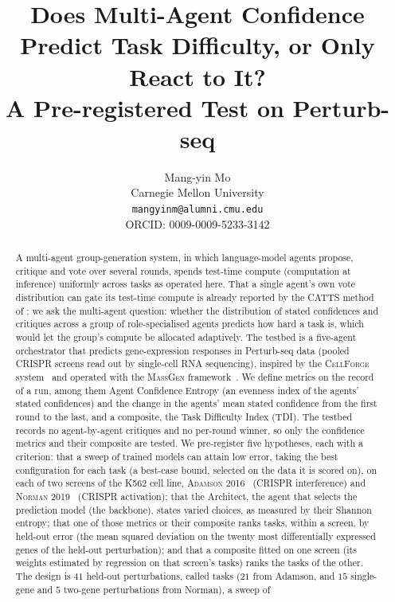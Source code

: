 \documentclass[10pt,a4paper]{article}
\title{Does Multi-Agent Confidence Predict Task Difficulty, or Only React to It?\\
       A Pre-registered Test on Perturb-seq}
\author{%
  Mang-yin Mo\\
  Carnegie Mellon University\\
  \texttt{mangyinm@alumni.cmu.edu}\\
  ORCID: 0009-0009-5233-3142%
}
\date{}
\begin{document}
\maketitle

\begin{abstract}
A multi-agent group-generation system, in which language-model agents propose,
critique and vote over several rounds, spends test-time compute (computation at
inference) uniformly across tasks as operated here. That a single agent's own vote distribution can gate its test-time compute
is already reported by the \textsc{CATTS} method of \citet{lee2026catts}; we ask the
multi-agent question: whether the distribution of stated confidences and
critiques across a group of role-specialised agents predicts how hard a task
is, which would let the group's compute be allocated adaptively. The testbed is
a five-agent orchestrator that predicts gene-expression responses in Perturb-seq
data (pooled CRISPR screens read out by single-cell RNA sequencing), inspired by
the \textsc{CellForge} system~\citep{chen2025cellforge} and operated with the
\textsc{MassGen} framework~\citep{massgen2025github}. We define metrics on
the record of a run, among them Agent Confidence Entropy (an evenness index of the
agents' stated confidences) and the change in the agents' mean stated confidence
from the first round to the last, and a composite, the Task Difficulty Index (TDI).
The testbed records no agent-by-agent critiques and no per-round winner, so only the
confidence metrics and their composite are tested. We pre-register five hypotheses, each with
a criterion: that a sweep of trained models can attain low error, taking the best
configuration for each task (a best-case bound, selected on the data it is scored
on), on each of two screens of the K562 cell
line, \textsc{Adamson 2016}~\citep{adamson2016perturbseq} (CRISPR interference) and
\textsc{Norman 2019}~\citep{norman2019perturbseq} (CRISPR activation); that the
Architect, the agent that selects the prediction model (the backbone), states varied
choices, as measured by their Shannon entropy; that one of those metrics or their
composite ranks tasks, within a screen, by held-out error (the mean squared deviation
on the twenty most differentially expressed genes of the held-out perturbation); and
that a composite fitted on one screen (its weights estimated by regression on that screen's tasks) ranks the tasks of the other. The design is $41$ held-out
perturbations, called tasks ($21$ from Adamson, and $15$ single-gene and $5$
two-gene perturbations from Norman), a sweep of \resNTrainerRecordsPerTask{}

\end{abstract}
\end{document}

